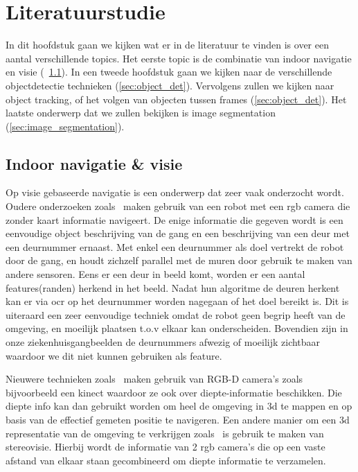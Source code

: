 
\chapter{Literatuurstudie}

In dit hoofdstuk gaan we kijken wat er in de literatuur te vinden is over een aantal verschillende topics.
Het eerste topic is de combinatie van indoor navigatie en visie (~\ref{sec:nav_visie}).
In een tweede hoofdstuk gaan we kijken naar de verschillende objectdetectie technieken (\ref{sec:object_det}).
Vervolgens zullen we kijken naar object tracking, of het volgen van objecten tussen frames (\ref{sec:object_det}).
Het laatste onderwerp dat we zullen bekijken is image segmentation (\ref{sec:image_segmentation}).

    \section{Indoor navigatie \& visie} \label{sec:nav_visie}
        Op visie gebaseerde navigatie is een onderwerp dat zeer vaak onderzocht wordt. Oudere onderzoeken zoals~\cite{Tomono2000} maken gebruik van een robot met een \gls{rgb} camera die zonder kaart informatie navigeert.
        De enige informatie die gegeven wordt is een eenvoudige object beschrijving van de gang en een beschrijving van een deur met een deurnummer ernaast.
        Met enkel een deurnummer als doel vertrekt de robot door de gang, en houdt zichzelf parallel met de muren door gebruik te maken van andere sensoren. Eens er een deur in beeld komt, worden er een aantal features(randen)
        herkend in het beeld.
        Nadat hun algoritme de deuren herkent kan er via \gls{ocr} op het deurnummer worden nagegaan of het doel bereikt is.
        Dit is uiteraard een zeer eenvoudige techniek omdat de robot geen begrip heeft van de omgeving, en moeilijk plaatsen t.o.v elkaar kan onderscheiden.
        Bovendien zijn in onze ziekenhuisgangbeelden de deurnummers afwezig of moeilijk zichtbaar waardoor we dit niet kunnen gebruiken als feature.

        Nieuwere technieken zoals~\cite{Henry10rgb-dmapping} maken gebruik van RGB-D camera's zoals bijvoorbeeld een kinect waardoor ze ook over diepte-informatie beschikken.
        Die diepte info kan dan gebruikt worden om heel de omgeving in 3d te mappen en op basis van de effectief gemeten positie te navigeren.
        Een andere manier om een 3d representatie van de omgeving te verkrijgen zoals~\cite{schmid2013} is gebruik te maken van stereovisie.
        Hierbij wordt de informatie van 2 \gls{rgb} camera's die op een vaste afstand van elkaar staan gecombineerd om diepte informatie te verzamelen.

